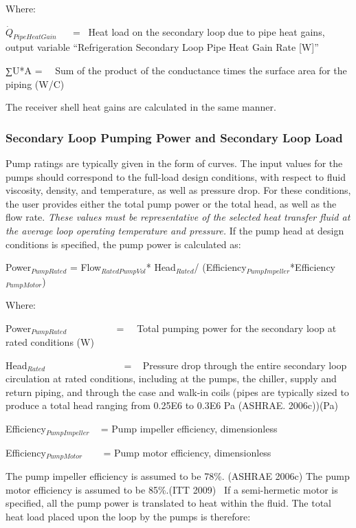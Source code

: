 Where:

\({\dot Q_{PipeHeatGain}}\) ~~ = ~Heat load on the secondary loop due to pipe heat gains, output variable ``Refrigeration Secondary Loop Pipe Heat Gain Rate {[}W{]}''

∑U*A = ~~Sum of the product of the conductance times the surface area for the piping (W/C)

The receiver shell heat gains are calculated in the same manner.

\subsubsection{Secondary Loop Pumping Power and Secondary Loop Load}\label{secondary-loop-pumping-power-and-secondary-loop-load}

Pump ratings are typically given in the form of curves. The input values for the pumps should correspond to the full-load design conditions, with respect to fluid viscosity, density, and temperature, as well as pressure drop. For these conditions, the user provides either the total pump power or the total head, as well as the flow rate. \emph{These values must be representative of the selected heat transfer fluid at the average loop operating temperature and pressure.} If the pump head at design conditions is specified, the pump power is calculated as:

Power\(_{PumpRated}\) = Flow\(_{RatedPumpVol}\)* Head\(_{Rated}\)/ (Efficiency\(_{PumpImpeller}\)*Efficiency\(_{PumpMotor}\))

Where:

Power\(_{PumpRated}\) ~~~~~~~~~ = ~~Total pumping power for the secondary loop at rated conditions (W)

Head\(_{Rated}\)~~~~~~~~ ~~~~~~~ = ~ Pressure drop through the entire secondary loop circulation at rated conditions, including at the pumps, the chiller, supply and return piping, and through the case and walk-in coils (pipes are typically sized to produce a total head ranging from 0.25E6 to 0.3E6 Pa (ASHRAE. 2006c))(Pa)

Efficiency\(_{PumpImpeller}\) ~ = Pump impeller efficiency, dimensionless

Efficiency\(_{PumpMotor}\)~~ ~ = Pump motor efficiency, dimensionless

The pump impeller efficiency is assumed to be 78\%. (ASHRAE 2006c) The pump motor efficiency is assumed to be 85\%.(ITT 2009)~ If a semi-hermetic motor is specified, all the pump power is translated to heat within the fluid. The total heat load placed upon the loop by the pumps is therefore:


